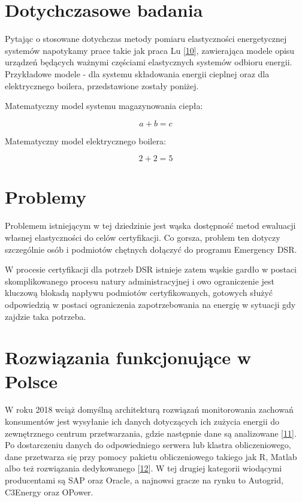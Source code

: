 \hypertarget{dotychczasowe-badania}{%
\section{Dotychczasowe badania}\label{dotychczasowe-badania}}

Pytając o stosowane dotychczas metody pomiaru elastyczności
energetycznej systemów napotykamy prace takie jak praca Lu
{[}\protect\hyperlink{ref-lu_probabilistic_2018}{10}{]}, zawierająca
modele opisu urządzeń będących ważnymi częściami elastycznych systemów
odbioru energii. Przykładowe modele - dla systemu składowania energii
cieplnej oraz dla elektrycznego boilera, przedstawione zostały poniżej.

Matematyczny model systemu magazynowania ciepła:

\[a + b = c\]

Matematyczny model elektrycznego boilera:

\[2 + 2 = 5\]

\hypertarget{problemy}{%
\section{Problemy}\label{problemy}}

Problemem istniejącym w tej dziedzinie jest wąska dostępność metod
ewaluacji własnej elastyczności do celów certyfikacji. Co gorsza,
problem ten dotyczy szczególnie osób i podmiotów chętnych dołączyć do
programu Emergency DSR.

W procesie certyfikacji dla potrzeb DSR istnieje zatem wąskie gardło w
postaci skomplikowanego procesu natury administracyjnej i owo
ograniczenie jest kluczową blokadą napływu podmiotów certyfikowanych,
gotowych służyć odpowiedzią w postaci ograniczenia zapotrzebowania na
energię w sytuacji gdy zajdzie taka potrzeba.

\hypertarget{rozwiux105zania-funkcjonujux105ce-w-polsce}{%
\section{Rozwiązania funkcjonujące w
Polsce}\label{rozwiux105zania-funkcjonujux105ce-w-polsce}}

W roku 2018 wciąż domyślną architekturą rozwiązań monitorowania zachowań
konsumentów jest wysyłanie ich danych dotyczących ich zużycia energii do
zewnętrznego centrum przetwarzania, gdzie następnie dane są analizowane
{[}\protect\hyperlink{ref-carroll_household_2018}{11}{]}. Po
dostarczeniu danych do odpowiedniego serwera lub klastra obliczeniowego,
dane przetwarza się przy pomocy pakietu obliczeniowego takiego jak R,
Matlab albo też rozwiązania dedykowanego
{[}\protect\hyperlink{ref-liu_smart_2016}{12}{]}. W tej drugiej
kategorii wiodącymi producentami są SAP oraz Oracle, a najnowsi gracze
na rynku to Autogrid, C3Energy oraz OPower.

